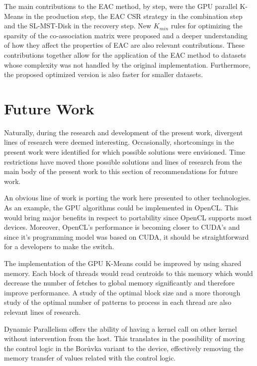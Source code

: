 The main contributions to the EAC method, by step, were the GPU parallel K-Means in the production step, the EAC CSR strategy in the combination step and the SL-MST-Disk in the recovery step.
New $K_{min}$ rules for optimizing the sparsity of the co-association matrix were proposed and a deeper understanding of how they affect the properties of EAC are also relevant contributions.
These contributions together allow for the application of the EAC method to datasets whose complexity was not handled by the original implementation.
Furthermore, the proposed optimized version is also faster for smaller datasets.


\section{Future Work}
\label{section:future}

Naturally, during the research and development of the present work, divergent lines of research were deemed interesting.
Occasionally, shortcomings in the present work were identified for which possible solutions were envisioned.
Time restrictions have moved those possible solutions and lines of research from the main body of the present work to this section of recommendations for future work.

An obvious line of work is porting the work here presented to other technologies.
As an example, the GPU algorithms could be implemented in OpenCL.
This would bring major benefits in respect to portability since OpenCL supports most devices.
Moreover, OpenCL's performance is becoming closer to CUDA's and since it's programming model was based on CUDA, it should be straightforward for a developers to make the switch.

The implementation of the GPU K-Means could be improved by using shared memory.
Each block of threads would read centroids to this memory which would decrease the number of fetches to global memory significantly and therefore improve performance.
A study of the optimal block size and a more thorough study of the optimal number of patterns to process in each thread are also relevant lines of research.

Dynamic Parallelism offers the ability of having a kernel call on other kernel without intervention from the host.
This translates in the possibility of moving the control logic in the Borůvka variant to the device, effectively removing the memory transfer of values related with the control logic.

